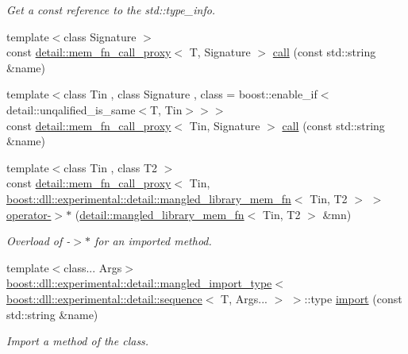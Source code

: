 \begin{DoxyCompactItemize}
\begin{DoxyCompactList}\small\item\em Get a const reference to the std\+::type\+\_\+info. \end{DoxyCompactList}\item 
{\footnotesize template$<$class Signature $>$ }\\const \hyperlink{a00216}{detail\+::mem\+\_\+fn\+\_\+call\+\_\+proxy}$<$ T, Signature $>$ \hyperlink{a00155_a69d3811c5d11899f42327de152536136}{call} (const std\+::string \&name)
\item 
{\footnotesize template$<$class Tin , class Signature , class  = boost\+::enable\+\_\+if$<$detail\+::unqalified\+\_\+is\+\_\+same$<$\+T, Tin$>$$>$$>$ }\\const \hyperlink{a00216}{detail\+::mem\+\_\+fn\+\_\+call\+\_\+proxy}$<$ Tin, Signature $>$ \hyperlink{a00155_a87e84e80e9ccb1fd92484cd0303b22b8}{call} (const std\+::string \&name)
\item 
{\footnotesize template$<$class Tin , class T2 $>$ }\\const \hyperlink{a00216}{detail\+::mem\+\_\+fn\+\_\+call\+\_\+proxy}$<$ Tin, \hyperlink{a00211}{boost\+::dll\+::experimental\+::detail\+::mangled\+\_\+library\+\_\+mem\+\_\+fn}$<$ Tin, T2 $>$ $>$ \hyperlink{a00155_a440bc2d1d5344c731607b0a6c4be4fd9}{operator-\/$>$$\ast$} (\hyperlink{a00211}{detail\+::mangled\+\_\+library\+\_\+mem\+\_\+fn}$<$ Tin, T2 $>$ \&mn)\hypertarget{a00155_a440bc2d1d5344c731607b0a6c4be4fd9}{}\label{a00155_a440bc2d1d5344c731607b0a6c4be4fd9}

\begin{DoxyCompactList}\small\item\em Overload of -\/$>$$\ast$ for an imported method. \end{DoxyCompactList}\item 
{\footnotesize template$<$class... Args$>$ }\\\hyperlink{a00206}{boost\+::dll\+::experimental\+::detail\+::mangled\+\_\+import\+\_\+type}$<$ \hyperlink{a00266}{boost\+::dll\+::experimental\+::detail\+::sequence}$<$ T, Args... $>$ $>$\+::type \hyperlink{a00155_a343a8146d111c9fa08a1942f0549af17}{import} (const std\+::string \&name)\hypertarget{a00155_a343a8146d111c9fa08a1942f0549af17}{}\label{a00155_a343a8146d111c9fa08a1942f0549af17}

\begin{DoxyCompactList}\small\item\em Import a method of the class. \end{DoxyCompactList}\end{DoxyCompactItemize}
